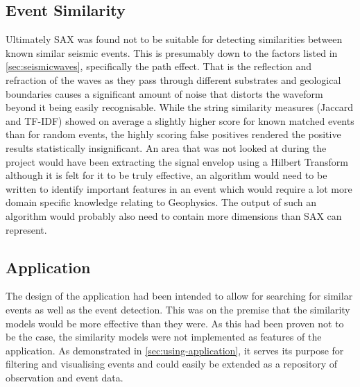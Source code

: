 \documentclass[../report.tex]{subfiles}
\begin{document}
\subsection{Event Similarity}

	Ultimately SAX was found not to be suitable for detecting similarities between known similar seismic events.  This is presumably down to the factors listed in \cref{sec:seismicwaves}, specifically the path effect.  That is the reflection and refraction of the waves as they pass through different substrates and geological boundaries causes a significant amount of noise that distorts the waveform beyond it being easily recognisable.  While the string similarity measures (Jaccard and TF-IDF) showed on average a slightly higher score for known matched events than for random events, the highly scoring false positives rendered the positive results statistically insignificant.  An area that was not looked at during the project would have been extracting the signal envelop using a Hilbert Transform although it is felt for it to be truly effective, an algorithm would need to be written to identify important features in an event which would require a lot more domain specific knowledge relating to Geophysics.  The output of such an algorithm would probably also need to contain more dimensions than SAX can represent.
	
\subsection{Application}

	The design of the application had been intended to allow for searching for similar events as well as the event detection.  This was on the premise that the similarity models would be more effective than they were.  As this had been proven not to be the case, the similarity models were not implemented as features of the application.  As demonstrated in \cref{sec:using-application}, it serves its purpose for filtering and visualising events and could easily be extended as a repository of observation and event data.
	
\end{document}
